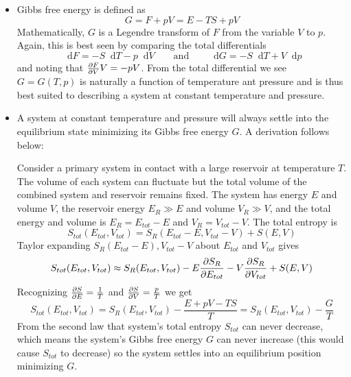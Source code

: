 \documentclass[11pt, a4paper]{article}
\newcommand{\eqtext}[1]{\qquad \text{#1} \qquad}
\newcommand{\diff}{\mathop{}\!\mathrm{d}} %
\begin{document}
\begin{itemize}
	\item Gibbs free energy is defined as
	\begin{equation*}
		G = F + pV = E - TS + pV
	\end{equation*}
	Mathematically, $ G $ is a Legendre transform of $ F $ from the variable $ V $ to $ p $. Again, this is best seen by comparing the total differentials
	\begin{equation*}
		\diff F = - S \diff T - p \diff V \eqtext{and} \diff G = - S \diff T + V \diff p
	\end{equation*}
	and noting that $ \pdv{F}{V}V = - p V $. From the total differential we see $ G = G(T, p) $ is naturally a function of temperature ant pressure and is thus best suited to describing a system at constant temperature and pressure.
	
	\item A system at constant temperature and pressure will always settle into the equilibrium state minimizing its Gibbs free energy $ G $. A derivation follows below:
	
	Consider a primary system in contact with a large reservoir at temperature $ T $. The volume of each system can fluctuate but the total volume of the combined system and reservoir remains fixed. The system has energy $ E $ and volume  $ V $, the reservoir energy $ E_{R} \gg E $ and volume $ V_{R} \gg V $, and the total energy and volume is $ E_{R} = E_{tot} - E $ and $ V_{R} = V_{tot} - V $. The total entropy is
	\begin{equation*}
		S_{tot}(E_{tot}, V_{tot}) = S_{R}(E_{tot} - E, V_{tot} - V) + S(E, V)
	\end{equation*}
	Taylor expanding $ S_{R}(E_{tot}- E), V_{tot} - V $ about $ E_{tot} $ and $ V_{tot} $ gives
	\begin{equation*}
		S_{tot}(E_{tot}, V_{tot}) \approx S_{R}(E_{tot}, V_{tot}) - E\pdv{S_{R}}{E_{tot}} - V\pdv{S_{R}}{V_{tot}} + S(E, V)
	\end{equation*}
	Recognizing $ \pdv{S}{E} = \frac{1}{T}  $ and $ \pdv{S}{V} = \frac{p}{T} $ we get
	\begin{equation*}
		S_{tot}(E_{tot}, V_{tot}) = S_{R}(E_{tot}, V_{tot}) - \frac{E + pV - TS}{T} = S_{R}(E_{tot}, V_{tot}) - \frac{G}{T}
	\end{equation*}
	From the second law that system's total entropy $ S_{tot} $ can never decrease, which means the system's Gibbs free energy $ G $ can never increase (this would cause $ S_{tot} $ to decrease) so the system settles into an equilibrium position minimizing $ G $.
		
\end{itemize}
\end{document}
